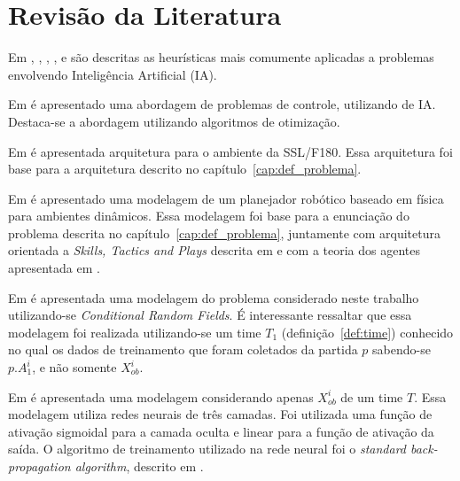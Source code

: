 \chapter{Revisão da Literatura}\label{cap:rev_bibliografica}


Em \cite{russellnorvig}, \cite{haykin2001redes}, \cite{kosko1997fuzzy}, \cite{passos2005datamining},
\cite{doringo2004ant} e \cite{bertsimas1993simulated} são descritas as heurísticas
mais comumente aplicadas a problemas envolvendo Inteligência Artificial (IA).

Em \cite{yoneyama2004ia} é apresentado uma abordagem de problemas de controle, utilizando de IA\@. Destaca-se
a abordagem utilizando algoritmos de otimização.

Em \cite{felixnavarro} é apresentada arquitetura para o ambiente da SSL/F180. Essa arquitetura foi base
para a arquitetura descrito no capítulo~\ref{cap:def_problema}.

Em \cite{zickler} é apresentado uma modelagem de um planejador robótico baseado em física para ambientes dinâmicos. 
Essa modelagem foi base para a enunciação do problema descrita no capítulo~\ref{cap:def_problema}, juntamente com 
arquitetura orientada a \textit{Skills, Tactics and Plays} descrita em \cite{bowling2003plays} e com a teoria dos 
agentes apresentada em \cite{russellnorvig}.

Em \cite{vail2008crf} é apresentada uma modelagem do problema considerado neste trabalho
utilizando-se \textit{Conditional Random Fields}. É interessante ressaltar que essa modelagem
foi realizada utilizando-se um time $T_1$ (definição~\ref{def:time}) conhecido no qual os dados
de treinamento que foram coletados da partida $p$ sabendo-se $p.A_1^{i}$, e não somente $X_{ob}^{i}$.

Em \cite{sheng2005motionprediction} é apresentada uma modelagem considerando apenas $X_{ob}^{i}$
de um time $T$. Essa modelagem utiliza redes neurais de três camadas. Foi utilizada
uma função de ativação sigmoidal para a camada oculta e linear para a função de 
ativação da saída. O algoritmo de treinamento utilizado na rede neural foi o \textit{standard back-propagation
algorithm}, descrito em \cite{haykin2001redes}.
